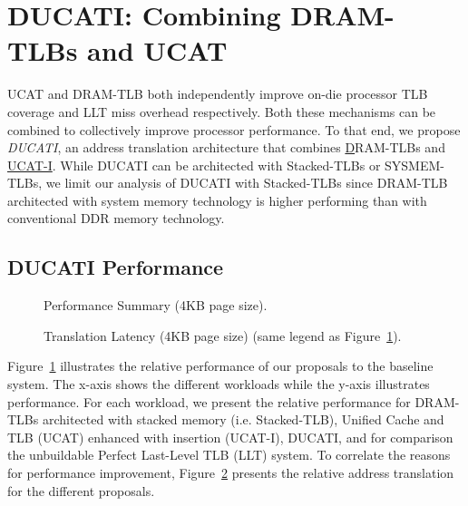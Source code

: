 \section{DUCATI: Combining DRAM-TLBs \newline and UCAT}
\label{sec:DUCATI}

\noindent UCAT and DRAM-TLB both independently improve on-die
processor TLB coverage and LLT miss overhead respectively. Both these
mechanisms can be combined to collectively improve processor
performance. To that end, we propose {\em DUCATI}, an address
translation architecture that combines \underline{D}RAM-TLBs and
\underline{UCAT-I}. While DUCATI can be architected with Stacked-TLBs
or SYSMEM-TLBs, we limit our analysis of DUCATI with Stacked-TLBs
since DRAM-TLB architected with system memory technology is higher
performing than with conventional DDR memory technology.

\subsection{DUCATI Performance}

\begin{figure}[tp] 
\vspace{-0 in} \centering
\centerline{}

\caption{\small Performance Summary (4KB page size).\normalsize}
\label{fig:summary_4k_pages_perf} 
\vspace{0.1 in}
\end{figure}

\begin{figure}[tp] 
\vspace{0.1 in} \centering
\centerline{}

\caption{\small Translation Latency (4KB page size) (same legend as
  Figure~\ref{fig:summary_4k_pages_perf}).\normalsize}
\label{fig:summary_4k_pages_lat} 
\vspace{-0. in}
\end{figure}

\noindent Figure~\ref{fig:summary_4k_pages_perf} illustrates the
relative performance of our proposals to the baseline system. The
x-axis shows the different workloads while the y-axis illustrates
performance. For each workload, we present the relative performance
for DRAM-TLBs architected with stacked memory (i.e. Stacked-TLB),
Unified Cache and TLB (UCAT) enhanced with insertion (UCAT-I), DUCATI,
and for comparison the unbuildable Perfect Last-Level TLB (LLT)
system. To correlate the reasons for performance improvement,
Figure~\ref{fig:summary_4k_pages_lat} presents the relative address
translation for the different proposals.

